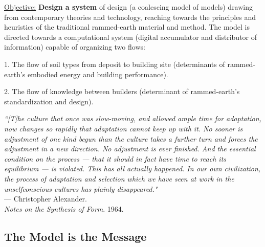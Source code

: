 \vspace{5mm}

\underline{Objective:} \textbf{Design a system} of design (a coalescing model of models) drawing from contemporary theories and technology, reaching towards the principles and heuristics of the traditional rammed-earth material and method. The model is directed towards a computational system (digital accumulator and distributor of information) capable of organizing two flows:

1. The flow of soil types from deposit to building site (determinants of rammed-earth's embodied energy and building performance).

2. The flow of knowledge between builders (determinant of rammed-earth's standardization and design).


\begin{flushright}
\small{
\textit{``[T]he culture that once was slow-moving, and allowed ample time for adaptation, now changes so rapidly that adaptation cannot keep up with it. No sooner is adjustment of one kind begun than the culture takes a further turn and forces the adjustment in a new direction. No adjustment is ever finished. And the essential condition on the process --- that it should in fact have time to reach its equilibrium --- is violated. This has all actually happened. In our own civilization, the process of adaptation and selection which we have seen at work in the unselfconscious cultures has plainly disappeared."}}\\ --- Christopher Alexander. \\ \textit{Notes on the Synthesis of Form}. 1964.
\end{flushright}





\clearpage

\subsection{The Model is the Message}

